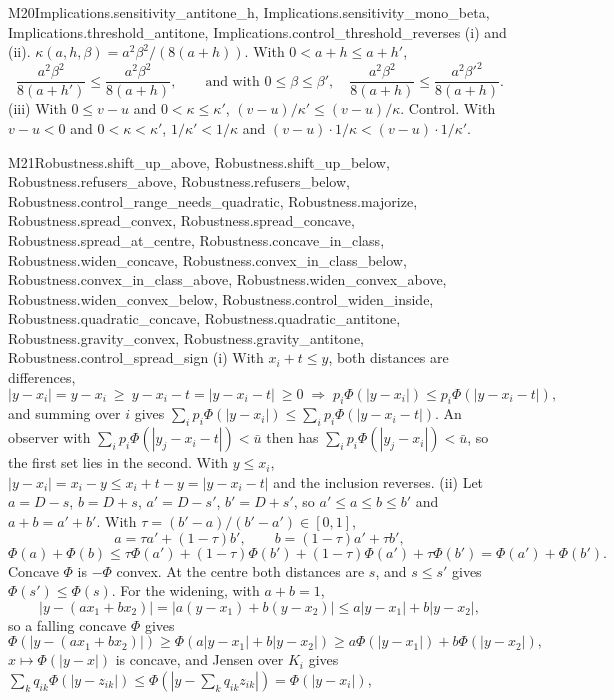 \begin{mproof}{M20}{Implications.sensitivity_antitone_h, Implications.sensitivity_mono_beta, Implications.threshold_antitone, Implications.control_threshold_reverses}
(i) and (ii). $\kappa(a,h,\beta)=a^2\beta^2/(8(a+h))$. With $0<a+h\le a+h'$,
\[
\frac{a^2\beta^2}{8(a+h')}\le\frac{a^2\beta^2}{8(a+h)},
\qquad\text{and with } 0\le\beta\le\beta',\quad
\frac{a^2\beta^2}{8(a+h)}\le\frac{a^2\beta'^2}{8(a+h)}.
\]
(iii) With $0\le v-u$ and $0<\kappa\le\kappa'$, $(v-u)/\kappa'\le(v-u)/\kappa$.
Control. With $v-u<0$ and $0<\kappa<\kappa'$, $1/\kappa'<1/\kappa$ and
$(v-u)\cdot1/\kappa<(v-u)\cdot1/\kappa'$.
\end{mproof}

\begin{mproof}{M21}{Robustness.shift_up_above, Robustness.shift_up_below, Robustness.refusers_above, Robustness.refusers_below, Robustness.control_range_needs_quadratic, Robustness.majorize, Robustness.spread_convex, Robustness.spread_concave, Robustness.spread_at_centre, Robustness.concave_in_class, Robustness.widen_concave, Robustness.convex_in_class_below, Robustness.convex_in_class_above, Robustness.widen_convex_above, Robustness.widen_convex_below, Robustness.control_widen_inside, Robustness.quadratic_concave, Robustness.quadratic_antitone, Robustness.gravity_convex, Robustness.gravity_antitone, Robustness.control_spread_sign}
(i) With $x_i+t\le y$, both distances are differences,
\[
|y-x_i|=y-x_i\ \ge\ y-x_i-t=|y-x_i-t|\ \ge0
\;\Longrightarrow\;
p_i\Phi(|y-x_i|)\le p_i\Phi(|y-x_i-t|),
\]
and summing over $i$ gives $\sum_ip_i\Phi(|y-x_i|)\le\sum_ip_i\Phi(|y-x_i-t|)$.
An observer with $\sum_ip_i\Phi(|y_j-x_i-t|)<\bar u$ then has
$\sum_ip_i\Phi(|y_j-x_i|)<\bar u$, so the first set lies in the second. With
$y\le x_i$, $|y-x_i|=x_i-y\le x_i+t-y=|y-x_i-t|$ and the inclusion reverses.
(ii) Let $a=D-s$, $b=D+s$, $a'=D-s'$, $b'=D+s'$, so $a'\le a\le b\le b'$ and
$a+b=a'+b'$. With $\tau=(b'-a)/(b'-a')\in[0,1]$,
\[
a=\tau a'+(1-\tau)b',\qquad b=(1-\tau)a'+\tau b',
\]
\[
\Phi(a)+\Phi(b)\le\tau\Phi(a')+(1-\tau)\Phi(b')+(1-\tau)\Phi(a')+\tau\Phi(b')
=\Phi(a')+\Phi(b').
\]
Concave $\Phi$ is $-\Phi$ convex. At the centre both distances are $s$, and
$s\le s'$ gives $\Phi(s')\le\Phi(s)$. For the widening, with $a+b=1$,
\[
|y-(ax_1+bx_2)|=|a(y-x_1)+b(y-x_2)|\le a|y-x_1|+b|y-x_2| ,
\]
so a falling concave $\Phi$ gives
\[
\Phi(|y-(ax_1+bx_2)|)\ge\Phi(a|y-x_1|+b|y-x_2|)\ge a\Phi(|y-x_1|)+b\Phi(|y-x_2|),
\]
$x\mapsto\Phi(|y-x|)$ is concave, and Jensen over $K_i$ gives
$\sum_kq_{ik}\Phi(|y-z_{ik}|)\le\Phi(|y-\sum_kq_{ik}z_{ik}|)=\Phi(|y-x_i|)$,

\end{mproof}
